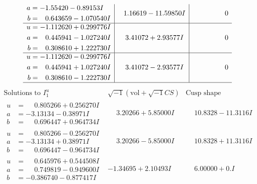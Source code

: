 \documentclass[1p]{elsarticle_modified}
\theoremstyle{definition}
\newcommand{\I}{\sqrt{-1}}
\begin{document}
$$\begin{array}{c|c|c}
\begin{aligned}
a &= -1.55420 - 0.89153 I \\
b &= \phantom{-}0.643659 - 1.070540 I\end{aligned}
 & \phantom{-}1.16619 - 11.59850 I & \phantom{-0.000000 } 0 \\ \hline\begin{aligned}
u &= -1.112620 + 0.299776 I \\
a &= \phantom{-}0.445941 - 1.027240 I \\
b &= \phantom{-}0.308610 + 1.222730 I\end{aligned}
 & \phantom{-}3.41072 + 2.93577 I & \phantom{-0.000000 } 0 \\ \hline\begin{aligned}
u &= -1.112620 - 0.299776 I \\
a &= \phantom{-}0.445941 + 1.027240 I \\
b &= \phantom{-}0.308610 - 1.222730 I\end{aligned}
 & \phantom{-}3.41072 - 2.93577 I & \phantom{-0.000000 } 0\\
 \hline 
 \end{array}$$\newpage$$\begin{array}{c|c|c}  
\text{Solutions to }I^u_{1}& \I (\text{vol} + \sqrt{-1}CS) & \text{Cusp shape}\\
 \hline 
\begin{aligned}
u &= \phantom{-}0.805266 + 0.256270 I \\
a &= -3.13134 - 0.38971 I \\
b &= \phantom{-}0.696447 + 0.964734 I\end{aligned}
 & \phantom{-}3.20266 + 5.85000 I & \phantom{-}10.8328 - 11.3116 I \\ \hline\begin{aligned}
u &= \phantom{-}0.805266 - 0.256270 I \\
a &= -3.13134 + 0.38971 I \\
b &= \phantom{-}0.696447 - 0.964734 I\end{aligned}
 & \phantom{-}3.20266 - 5.85000 I & \phantom{-}10.8328 + 11.3116 I \\ \hline\begin{aligned}
u &= \phantom{-}0.645976 + 0.544508 I \\
a &= \phantom{-}0.749819 - 0.949600 I \\
b &= -0.386740 - 0.877417 I\end{aligned}
 & -1.34695 + 2.10493 I & \phantom{-}6.00000 + 0. I\phantom{ +0.000000I} \\ \hline\begin{aligned}

\end{aligned}
\end{array}$$
\end{document}
